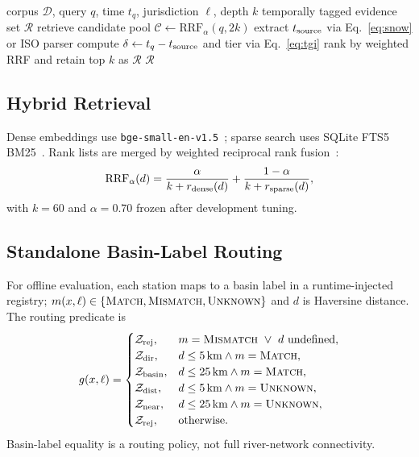 \documentclass[conference]{IEEEtran}
\begin{document}
\begin{algorithm}[t]
\caption{Query-time temporal evidence tagging}
\label{alg:tgi}
\begin{algorithmic}[1]
\REQUIRE corpus $\mathcal{D}$, query $q$, time $t_q$, jurisdiction $\ell$, depth $k$
\ENSURE temporally tagged evidence set $\mathcal{R}$
\STATE retrieve candidate pool $\mathcal{C}\leftarrow\mathrm{RRF}_\alpha(q,2k)$
\STATE extract $t_{\rm source}$ via Eq.~\eqref{eq:snow} or ISO parser
\STATE compute $\delta\leftarrow t_q-t_{\rm source}$ and tier via Eq.~\eqref{eq:tgi}
\ENDFOR
\STATE rank by weighted RRF and retain top $k$ as $\mathcal{R}$
\RETURN $\mathcal{R}$
\end{algorithmic}
\end{algorithm}

\subsection{Hybrid Retrieval}
Dense embeddings use \texttt{bge-small-en-v1.5}~\cite{bge}; sparse search uses SQLite FTS5 BM25~\cite{bm25}. Rank lists are merged by weighted reciprocal rank fusion~\cite{rrf}:
\begin{equation}
\mathrm{RRF}_\alpha(d)=\frac{\alpha}{k+r_{\rm dense}(d)}+\frac{1-\alpha}{k+r_{\rm sparse}(d)},
\end{equation}
with $k=60$ and $\alpha=0.70$ frozen after development tuning.

\subsection{Standalone Basin-Label Routing}
For offline evaluation, each station maps to a basin label in a runtime-injected registry; $m(x,\ell)\in\{\textsc{Match},\textsc{Mismatch},\textsc{Unknown}\}$ and $d$ is Haversine distance. The routing predicate is
\begin{equation}
g(x,\ell)=
\begin{cases}
\mathcal{Z}_{\rm rej},&m=\textsc{Mismatch}\ \lor\ d\ \text{undefined},\\
\mathcal{Z}_{\rm dir},&d\le5\,\mathrm{km}\land m=\textsc{Match},\\
\mathcal{Z}_{\rm basin},&d\le25\,\mathrm{km}\land m=\textsc{Match},\\
\mathcal{Z}_{\rm dist},&d\le5\,\mathrm{km}\land m=\textsc{Unknown},\\
\mathcal{Z}_{\rm near},&d\le25\,\mathrm{km}\land m=\textsc{Unknown},\\
\mathcal{Z}_{\rm rej},&\text{otherwise}.
\end{cases}
\end{equation}
Basin-label equality is a routing policy, not full river-network connectivity.
\end{document}
